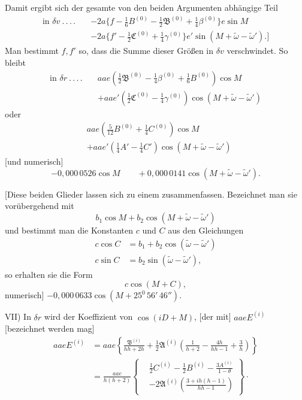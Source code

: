Damit ergibt sich der gesamte von den beiden Argumenten abhängige Teil
\[
\begin{aligned}
\text{in }\delta v\ .\, .\, .\, .\quad&-2a\{f-\tfrac16B^{(0)}-\tfrac12\mathfrak B^{(0)}+\tfrac14\beta^{(0)}\}e\sin M\\
&-2a\{f'-\tfrac12\mathfrak C^{(0)}+\tfrac14\gamma^{(0)}\}e'\sin(M+\tilde\omega-\tilde\omega').]
\end{aligned}
\]
Man bestimmt \(f,f'\) so, dass die Summe dieser Größen in \(\delta v\) verschwindet. So bleibt
\[
\begin{aligned}
\text{in }\delta r\ .\, .\, .\, .\quad&aae(\tfrac12\mathfrak B^{(0)}-\tfrac14\beta^{(0)}+\tfrac16B^{(0)})\cos M\\
&+aae'(\tfrac12\mathfrak C^{(0)}-\tfrac14\gamma^{(0)})\cos(M+\tilde\omega-\tilde\omega')
\end{aligned}
\]
oder
\[
\begin{aligned}
&aae(\tfrac5{12}B^{(0)}+\tfrac14C^{(0)})\cos M\\
&+aae'(\tfrac14A'-\tfrac14C')\cos(M+\tilde\omega-\tilde\omega')
\end{aligned}
\]
[und numerisch]
\[
-0{,}000\,0526\cos M\qquad+0{,}000\,0141\cos(M+\tilde\omega-\tilde\omega').
\]

[Diese beiden Glieder lassen sich zu einem zusammenfassen. Bezeichnet man sie vorübergehend mit
\[
b_1\cos M+b_2\cos(M+\tilde\omega-\tilde\omega')
\]
und bestimmt man die Konstanten \(c\) und \(C\) aus den Gleichungen
\[
\begin{aligned}
c\cos C&=b_1+b_2\cos(\tilde\omega-\tilde\omega')\\
c\sin C&=b_2\sin(\tilde\omega-\tilde\omega'),
\end{aligned}
\]
so erhalten sie die Form
\[
c\cos(M+C),
\]
numerisch] \(-0{,}000\,0633\cos(M+25^{0}\,56'\,46'').\)

VII) In \(\delta r\) wird der Koeffizient von \(\cos(iD+M)\), [der mit] \(aaeE^{(i)}\) [bezeichnet werden mag]
\[
\begin{aligned}
aaeE^{(i)}&=aae\left\{\frac{\mathfrak B^{(i)}}{hh+2h}+\tfrac12\mathfrak A^{(i)}\left(\frac1{h+2}-\frac{4h}{hh-1}+\frac3h\right)\right\}\\
&=\frac{aae}{h(h+2)}\left\{\begin{aligned}
&\tfrac12C^{(i)}-\tfrac12B^{(i)}-\frac{3A^{(i)}}{1-\theta}\\
&-2\mathfrak A^{(i)}\left(\frac{3+ih(h-1)}{hh-1}\right)
\end{aligned}\right\}\mathpunct{\cdot}
\end{aligned}
\]

